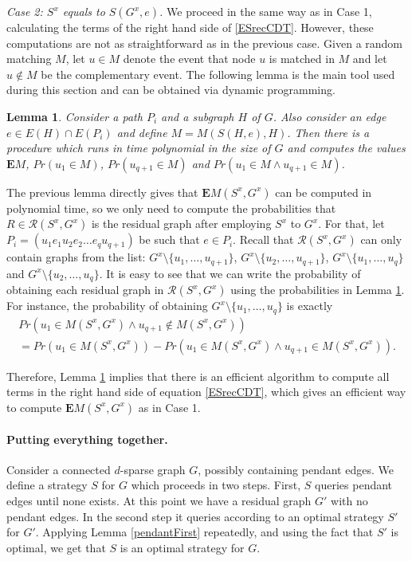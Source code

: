 \documentclass[12pt]{article}
\newtheorem{lemma}{Lemma}
\newcommand{\Mf}[2]{M(#1,#2)}
\newcommand{\EMf}[2]{\mathbf{E}M(#1,#2)}
\begin{document}
		\medskip \noindent \emph{Case 2: $S^x$ equals to $S(G^x, e)$.} We proceed in the same way as in Case 1, calculating the terms of the right hand side of \eqref{ESrecCDT}. However, these computations are not as straightforward as in the previous case. Given a random matching $M$, let $u \in M$ denote the event that node $u$ is matched in $M$ and let $u \notin M$ be the complementary event. The following lemma is the main tool used during this section and can be obtained via dynamic programming.
		
		\begin{lemma} \label{valueSPi}
			Consider a path $P_i$ and a subgraph $H$ of $G$. Also consider an edge $e \in E(H) \cap E(P_i)$ and define $M = M(S(H, e),H)$. Then there is a procedure which runs in time polynomial in the size of $G$ and computes the values $\mathbf{E}M$, $Pr(u_1 \in M)$, $Pr(u_{q+1} \in M)$ and $Pr(u_1 \in M \wedge u_{q + 1} \in M)$.
		\end{lemma}
		
		The previous lemma directly gives that $\EMf{S^x}{G^x}$ can be computed in polynomial time, so we only need to compute the probabilities that $R \in \mathcal{R}(S^x, G^x)$ is the residual graph after employing $S^x$ to $G^x$. For that, let $P_i = (u_1 e_1 u_2 e_2 \ldots e_q u_{q+1})$ be such that $e \in P_i$. Recall that $\mathcal{R}(S^x, G^x)$ can only contain graphs from the list: $G^x \setminus \{u_1, \ldots, u_{q + 1}\}$, $G^x \setminus \{u_2, \ldots, u_{q + 1}\}$, $G^x \setminus \{u_1, \ldots, u_q\}$ and $G^x \setminus \{u_2, \ldots, u_q\}$. It is easy to see that we can write the probability of obtaining each residual graph in $\mathcal{R}(S^x, G^x)$ using the probabilities in Lemma \ref{valueSPi}. For instance, the probability of obtaining $G^x \setminus \{u_1, \ldots, u_q\}$ is exactly 
\begin{multline*}
			Pr\left(u_1 \in \Mf{S^x}{G^x} \wedge u_{q + 1} \notin \Mf{S^x}{G^x}\right) \\
			= Pr\left(u_1 \in M(S^x, G^x)\right) - Pr\left(u_1 \in M(S^x, G^x) \wedge u_{q + 1} \in M(S^x, G^x)\right).	
		\end{multline*}
		
		Therefore, Lemma \ref{valueSPi} implies that there is an efficient algorithm to compute all terms in the right hand side of equation \eqref{ESrecCDT}, which gives an efficient way to compute $\EMf{S^x}{G^x}$ as in Case 1. 
		
	\paragraph{Putting everything together.} Consider a connected $d$-sparse graph $G$, possibly containing pendant edges. We define a strategy $S$ for $G$ which proceeds in two steps. First, $S$ queries pendant edges until none exists. At this point we have a residual graph $G'$ with no pendant edges. In the second step it queries according to an optimal strategy $S'$ for $G'$. Applying Lemma \ref{pendantFirst} repeatedly, and using the fact that $S'$ is optimal, we get that $S$ is an optimal strategy for $G$.
	
\end{document}
